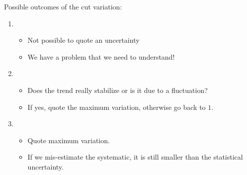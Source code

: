 Possible outcomes of the cut variation:

\begin{enumerate}
  \item \begin{itemize}[$\to$]
    \item Not possible to quote an uncertainty
    \item We have a problem that we need to understand!
  \end{itemize}
\item \begin{itemize}[$\to$]
    \item Does the trend really stabilize or is it due to a fluctuation?
    \item If yes, quote the maximum variation, otherwise go back to $1.$
\end{itemize}
\item \begin{itemize}[$\to$]
  \item Quote maximum variation.
  \item If we mis-estimate the systematic, it is still smaller than the statistical uncertainty. 
\end{itemize}
\end{enumerate}
